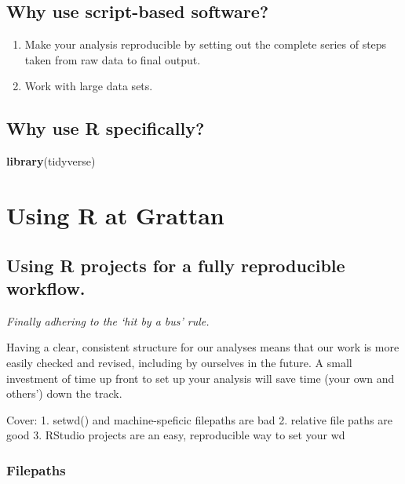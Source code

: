 \documentclass[]{book}
\newenvironment{Shaded}{\begin{snugshade}}{\end{snugshade}}
\newcommand{\KeywordTok}[1]{\textcolor[rgb]{0.13,0.29,0.53}{\textbf{#1}}}
\newcommand{\NormalTok}[1]{#1}
\providecommand{\tightlist}{%
  \setlength{\itemsep}{0pt}\setlength{\parskip}{0pt}}
\begin{document}
\hypertarget{why-script}{%
\section{Why use script-based software?}\label{why-script}}

\begin{enumerate}
\def\labelenumi{\arabic{enumi}.}
\tightlist
\item
  Make your analysis reproducible by setting out the complete series of steps taken from raw data to final output.
\item
  Work with large data sets.
\end{enumerate}

\hypertarget{why-R}{%
\section{Why use R specifically?}\label{why-R}}

\begin{Shaded}
\begin{Highlighting}[]
\KeywordTok{library}\NormalTok{(tidyverse)}
\end{Highlighting}
\end{Shaded}

\hypertarget{intro}{%
\chapter{Using R at Grattan}\label{intro}}

\hypertarget{using-r-projects-for-a-fully-reproducible-workflow.}{%
\section{Using R projects for a fully reproducible workflow.}\label{using-r-projects-for-a-fully-reproducible-workflow.}}

\emph{Finally adhering to the `hit by a bus' rule.}

Having a clear, consistent structure for our analyses means that our work is more easily checked and revised, including by ourselves in the future. A small investment of time up front to set up your analysis will save time (your own and others') down the track.

Cover:
1. setwd() and machine-speficic filepaths are bad
2. relative file paths are good
3. RStudio projects are an easy, reproducible way to set your wd

\hypertarget{filepaths}{%
\subsection{Filepaths}\label{filepaths}}
\end{document}
